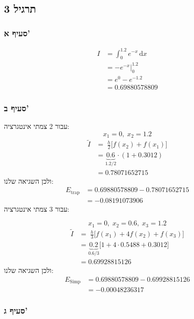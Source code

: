 \documentclass[
  a4paper,
]{article}
\begin{document}
\subsection{תרגיל 3}\label{ux5eaux5e8ux5d2ux5d9ux5dc-3}

\subsubsection{סעיף א'}\label{ux5e1ux5e2ux5d9ux5e3-ux5d0-1}

\[\begin{aligned}
I & =\int_{0}^{1.2} e^{-x} \, \mathrm{d}x \\[1ex]
 &  =-e^{-x}\bigg|_{0}^{1.2} \\[1ex]
& =e^{0}-e^{-1.2} \\[1ex]
 & =\boxed {
0.69880578809
 }
\end{aligned}\]

\subsubsection{סעיף ב'}\label{ux5e1ux5e2ux5d9ux5e3-ux5d1-2}

עבור 2 צמתי אינטגרציה: \[x_{1}=0,\; x_{2}=1.2\] \[\begin{aligned}
\tilde{I}  & =\;\frac{h}{2}\Big[f(x_{2})+f(x_{1})\Big]\\[1ex]
&=\underbrace{0.6}_{1.2/2}\cdot (1+0.3012)\\[1ex]
 & =0.78071652715
\end{aligned}\] ולכן השגיאה שלנו: \[\begin{aligned}
E_{\text{trap}} & =0.69880578809-0.78071652715 \\[1ex]
 & =\boxed{-0.08191073906}
\end{aligned}\] עבור 3 צמתי אינטגרציה:

\[x_{1}=0,\; x_{2}=0.6,\; x_{3}=1.2\] \[\begin{aligned}
\tilde{I}  & =\;\frac{h}{3}\Big[f(x_{1})+4f(x_{2})+f(x_{3})\Big] \\[1ex]
&=\underbrace{0.2}_{0.6/3}\Big[1+4\cdot 0.5488+0.3012\Big] \\[1ex]
 & =0.69928815126
\end{aligned}\] ולכן השגיאה שלנו: \[\begin{aligned}
E_{\text{Simp}} & =0.69880578809-0.69928815126 \\[1ex]
 & =\boxed{-0.00048236317}
\end{aligned}\]

\subsubsection{סעיף ג'}\label{ux5e1ux5e2ux5d9ux5e3-ux5d2-1}
\end{document}
